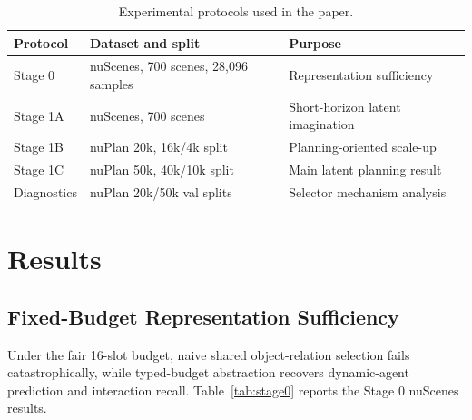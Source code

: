 \documentclass[10pt]{article}
\begin{document}
\begin{table}[t]
\centering
\caption{Experimental protocols used in the paper.}
\label{tab:protocols}
\begin{tabular}{lll}
\toprule
Protocol & Dataset and split & Purpose \\
\midrule
Stage 0 & nuScenes, 700 scenes, 28,096 samples & Representation sufficiency \\
Stage 1A & nuScenes, 700 scenes & Short-horizon latent imagination \\
Stage 1B & nuPlan 20k, 16k/4k split & Planning-oriented scale-up \\
Stage 1C & nuPlan 50k, 40k/10k split & Main latent planning result \\
Diagnostics & nuPlan 20k/50k val splits & Selector mechanism analysis \\
\bottomrule
\end{tabular}
\end{table}

\section{Results}
\subsection{Fixed-Budget Representation Sufficiency}
Under the fair 16-slot budget, naive shared object-relation selection fails catastrophically, while typed-budget abstraction recovers dynamic-agent prediction and interaction recall. Table~\ref{tab:stage0} reports the Stage 0 nuScenes results.
\end{document}
